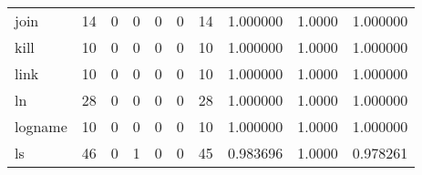 \begin{longtable}{lrrrrrrrrr}
join      &                                       14 &                                                  0 &                                                  0 &                                                  0 &                                                  0 &                                                 14 &                                           1.000000 &                                 1.0000 &                             1.000000 \\
kill      &                                       10 &                                                  0 &                                                  0 &                                                  0 &                                                  0 &                                                 10 &                                           1.000000 &                                 1.0000 &                             1.000000 \\
link      &                                       10 &                                                  0 &                                                  0 &                                                  0 &                                                  0 &                                                 10 &                                           1.000000 &                                 1.0000 &                             1.000000 \\
ln        &                                       28 &                                                  0 &                                                  0 &                                                  0 &                                                  0 &                                                 28 &                                           1.000000 &                                 1.0000 &                             1.000000 \\
logname   &                                       10 &                                                  0 &                                                  0 &                                                  0 &                                                  0 &                                                 10 &                                           1.000000 &                                 1.0000 &                             1.000000 \\
ls        &                                       46 &                                                  0 &                                                  1 &                                                  0 &                                                  0 &                                                 45 &                                           0.983696 &                                 1.0000 &                             0.978261 \\

\end{longtable}
